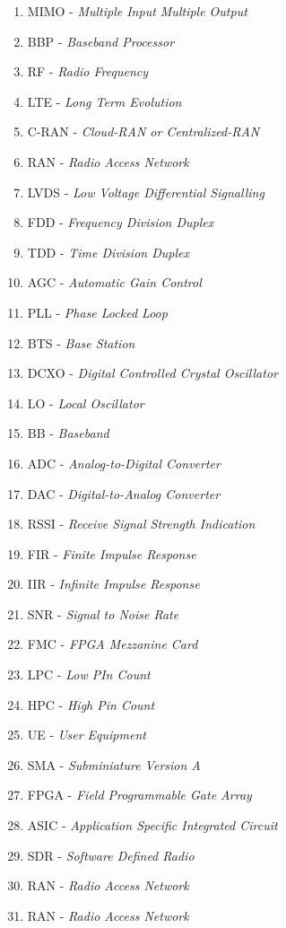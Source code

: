 \begin{enumerate}
	\item MIMO - \textit{Multiple Input Multiple Output}
	\item BBP - \textit{Baseband Processor}
	\item RF - \textit{Radio Frequency}
	\item LTE - \textit{Long Term Evolution}
	\item C-RAN - \textit{Cloud-RAN or Centralized-RAN}
	\item RAN - \textit{Radio Access Network}
	\item LVDS - \textit{Low Voltage Differential Signalling}
	\item FDD - \textit{Frequency Division Duplex}
	\item TDD - \textit{Time Division Duplex}
	\item AGC - \textit{Automatic Gain Control}
	\item PLL - \textit{Phase Locked Loop}
	\item BTS - \textit{Base Station}
	\item DCXO - \textit{Digital Controlled Crystal Oscillator}
	\item LO - \textit{Local Oscillator}
	\item BB - \textit{Baseband}
	\item ADC - \textit{Analog-to-Digital Converter}
	\item DAC - \textit{Digital-to-Analog Converter}
	\item RSSI - \textit{Receive Signal Strength Indication}
	\item FIR - \textit{Finite Impulse Response}
	\item IIR - \textit{Infinite Impulse Response}
	\item SNR - \textit{Signal to Noise Rate}
	\item FMC - \textit{FPGA Mezzanine Card}
	\item LPC - \textit{Low PIn Count}
	\item HPC - \textit{High Pin Count}
	\item UE - \textit{User Equipment}
	\item SMA - \textit{Subminiature Version A}
	\item FPGA - \textit{Field Programmable Gate Array}
	\item ASIC - \textit{Application Specific Integrated Circuit}
	\item SDR - \textit{Software Defined Radio}
	\item RAN - \textit{Radio Access Network}
	\item RAN - \textit{Radio Access Network}
\end{enumerate}
